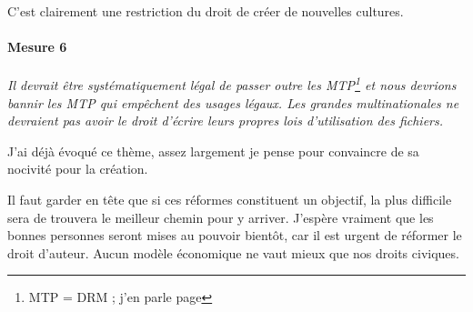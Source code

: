 C'est clairement une restriction du droit de créer de nouvelles cultures.

\paragraph{Mesure 6}
\textit{Il devrait être systématiquement légal de passer outre les MTP\footnote{MTP = DRM ; j'en parle page \pageref{drm}} et nous devrions bannir les MTP qui empêchent des usages légaux.
Les grandes multinationales ne devraient pas avoir le droit d'écrire leurs propres lois d'utilisation des fichiers.}

J'ai déjà évoqué ce thème, assez largement je pense pour convaincre de sa nocivité pour la création.

\vspace{50pt}

Il faut garder en tête que si ces réformes constituent un objectif, la plus difficile sera de trouvera le meilleur chemin pour y arriver.
J'espère vraiment que les bonnes personnes seront mises au pouvoir bientôt, car il est urgent de réformer le droit d'auteur.
Aucun modèle économique ne vaut mieux que nos droits civiques.

